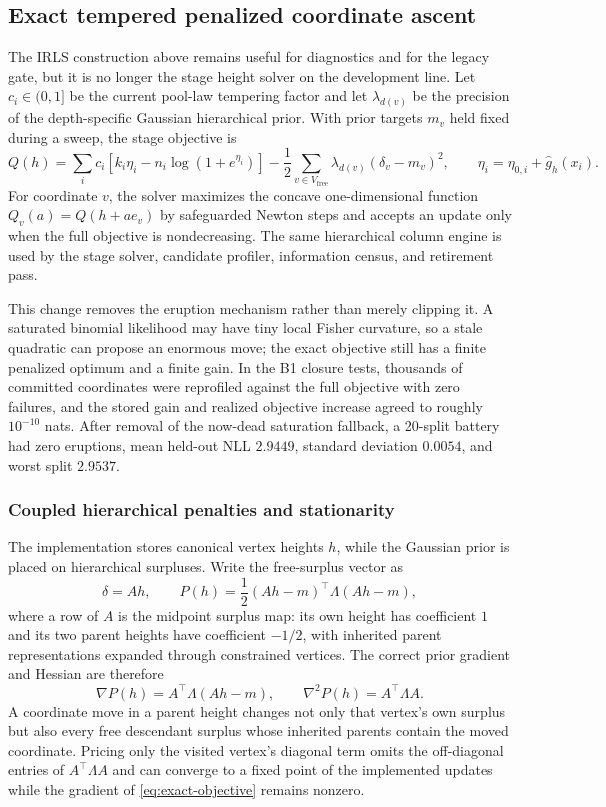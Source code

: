 \documentclass[11pt]{article}
\begin{document}
\subsection{Exact tempered penalized coordinate ascent}\label{sec:exactsolver}
The IRLS construction above remains useful for diagnostics and for the legacy gate, but it is no
longer the stage height solver on the development line. Let $c_i\in(0,1]$ be the current
pool-law tempering factor and let $\lambda_{d(v)}$ be the precision of the depth-specific Gaussian
hierarchical prior. With prior targets $m_v$ held fixed during a sweep, the stage objective is
\begin{equation}\label{eq:exact-objective}
Q(h)=\sum_i c_i\left[k_i\eta_i-n_i\log(1+e^{\eta_i})\right]
-\frac12\sum_{v\in V_{\mathrm{free}}}\lambda_{d(v)}(\delta_v-m_v)^2,
\qquad
\eta_i=\eta_{0,i}+\hat g_h(x_i).
\end{equation}
For coordinate $v$, the solver maximizes the concave one-dimensional function
$Q_v(a)=Q(h+a e_v)$ by safeguarded Newton steps and accepts an update only when the full objective
is nondecreasing. The same hierarchical column engine is used by the stage solver, candidate
profiler, information census, and retirement pass.

This change removes the eruption mechanism rather than merely clipping it. A saturated binomial
likelihood may have tiny local Fisher curvature, so a stale quadratic can propose an enormous move;
the exact objective still has a finite penalized optimum and a finite gain. In the B1 closure tests,
thousands of committed coordinates were reprofiled against the full objective with zero failures,
and the stored gain and realized objective increase agreed to roughly $10^{-10}$ nats. After removal
of the now-dead saturation fallback, a 20-split battery had zero eruptions, mean held-out NLL
$2.9449$, standard deviation $0.0054$, and worst split $2.9537$.

\subsubsection{Coupled hierarchical penalties and stationarity}
The implementation stores canonical vertex heights $h$, while the Gaussian prior is placed on
hierarchical surpluses. Write the free-surplus vector as
\[
\delta=Ah,
\qquad
P(h)=\frac12(Ah-m)^\top\Lambda(Ah-m),
\]
where a row of $A$ is the midpoint surplus map: its own height has coefficient $1$ and its two
parent heights have coefficient $-1/2$, with inherited parent representations expanded through
constrained vertices. The correct prior gradient and Hessian are therefore
\begin{equation}\label{eq:coupled-prior-gradient}
\nabla P(h)=A^\top\Lambda(Ah-m),
\qquad
\nabla^2P(h)=A^\top\Lambda A.
\end{equation}
A coordinate move in a parent height changes not only that vertex's own surplus but also every free
descendant surplus whose inherited parents contain the moved coordinate. Pricing only the visited
vertex's diagonal term omits the off-diagonal entries of $A^\top\Lambda A$ and can converge to a
fixed point of the implemented updates while the gradient of \eqref{eq:exact-objective} remains
nonzero.
\end{document}
